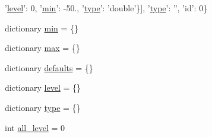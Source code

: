 \begin{DoxyCompactItemize}
'\hyperlink{namespacenubot__gazebo_1_1cfg_1_1NubotGazeboConfig_a86a0bbd69e81af35fe10e40ae4352da5}{level}'\-: 0, '\hyperlink{namespacenubot__gazebo_1_1cfg_1_1NubotGazeboConfig_aaab2b16c06362ada84e70a9ffef6fb37}{min}'\-: -\/50., '\hyperlink{namespacenubot__gazebo_1_1cfg_1_1NubotGazeboConfig_ab0240d7eb44c9b4bdcad07d3f882ac32}{type}'\-: 'double'\}\mbox{]}, '\hyperlink{namespacenubot__gazebo_1_1cfg_1_1NubotGazeboConfig_ab0240d7eb44c9b4bdcad07d3f882ac32}{type}'\-: '', 'id'\-: 0\}
\item 
dictionary \hyperlink{namespacenubot__gazebo_1_1cfg_1_1NubotGazeboConfig_aaab2b16c06362ada84e70a9ffef6fb37}{min} = \{\}
\item 
dictionary \hyperlink{namespacenubot__gazebo_1_1cfg_1_1NubotGazeboConfig_a6be2164301dd0e0a270aae0bb05784b6}{max} = \{\}
\item 
dictionary \hyperlink{namespacenubot__gazebo_1_1cfg_1_1NubotGazeboConfig_ab01b54da589cdcf0ecd5ef50966dc33a}{defaults} = \{\}
\item 
dictionary \hyperlink{namespacenubot__gazebo_1_1cfg_1_1NubotGazeboConfig_a86a0bbd69e81af35fe10e40ae4352da5}{level} = \{\}
\item 
dictionary \hyperlink{namespacenubot__gazebo_1_1cfg_1_1NubotGazeboConfig_ab0240d7eb44c9b4bdcad07d3f882ac32}{type} = \{\}
\item 
int \hyperlink{namespacenubot__gazebo_1_1cfg_1_1NubotGazeboConfig_a3a0649fc5f3abda5f7d733e81a02da97}{all\-\_\-level} = 0
\end{DoxyCompactItemize}


